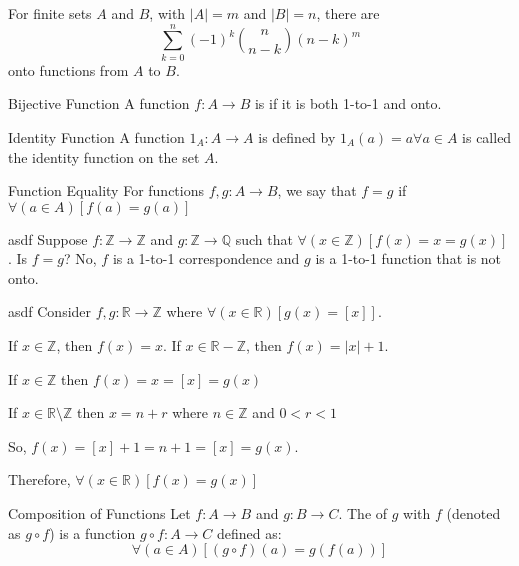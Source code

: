 \documentclass[12pt]{report}
\begin{document}
For finite sets $A$ and $B$, with $|A| = m$ and $|B| = n$, there are $$\sum_{k=0}^{n} (-1)^k {n \choose n-k} (n-k)^m$$ onto functions from $A$ to $B$.

\begin{dfnbox}{Bijective Function}
	A function $f: A \rightarrow B$ is  if it is both 1-to-1 and onto.
\end{dfnbox}

\begin{dfnbox}{Identity Function}
	A function $1_A: A \rightarrow A$ is defined by $1_A(a) = a \forall a \in A$ is called the identity function on the set $A$.
\end{dfnbox}

\begin{dfnbox}{Function Equality}
	For functions $f,g : A \rightarrow B$, we say that $f=g$ if $\forall(a \in A)\left[ f(a)=g(a) \right]$
\end{dfnbox}

\begin{exbox}{asdf}
	Suppose $f: \mathbb{Z} \rightarrow \mathbb{Z}$ and $g : \mathbb{Z} \rightarrow \mathbb{Q}$ such that $\forall(x \in \mathbb{Z}) \left[ f(x) = x = g(x) \right]$. Is $f=g$?
	\tcblower
	No, $f$ is a 1-to-1 correspondence and $g$ is a 1-to-1 function that is not onto.
\end{exbox}

\begin{exbox}{asdf}
	Consider $f,g : \mathbb{R} \rightarrow \mathbb{Z}$ where $\forall(x \in \mathbb{R}) \left[ g(x) = [x] \right]$.

	If $x \in \mathbb{Z}$, then $f(x) = x$. If $x \in \mathbb{R} - \mathbb{Z}$, then $f(x) = |x| + 1$.

	
	\tcblower

	If $x \in \mathbb{Z}$ then $f(x) = x = [x] = g(x)$

	If $x \in \mathbb{R} \setminus \mathbb{Z}$ then $x = n + r$ where $n \in \mathbb{Z}$ and $0<r<1$

	So, $f(x) = [x] + 1 =n + 1 = [x] = g(x)$.

	Therefore, $\forall(x \in \mathbb{R}) \left[ f(x) = g(x) \right]$
\end{exbox}

\begin{dfnbox}{Composition of Functions}
	Let $f : A \rightarrow B$ and $g : B \rightarrow C$. The  of $g$ with $f$ (denoted as $g \circ f$) is a function $g \circ f : A \rightarrow C$ defined as:
	$$\forall(a \in A) \left[ (g \circ f) (a) = g(f(a)) \right]$$
\end{dfnbox}
\end{document}
